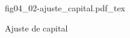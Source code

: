 \begin{figure}[h]
\centering
\def\svgwidth{0.5\textwidth}
{fig04_02-ajuste_capital.pdf_tex}
\caption{Ajuste de capital}
\label{fig04_02-ajuste_capital}
\end{figure}